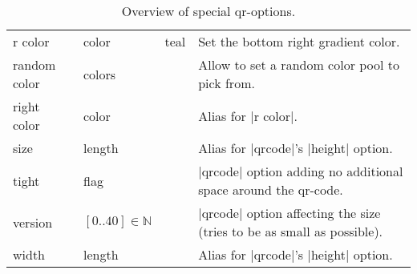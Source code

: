 \documentclass[parskip=half,english,numbers=noenddot,footnotes=nomultiple,oneside]{scrartcl}
\begin{document}
\begin{savenotes}
\begin{table}
\begin{tabular}{>{\ttfamily}ll>{\ttfamily}cp{.5\linewidth}}
		r color         & color   &  teal    & Set the bottom right gradient color.                         \\
		random color    & colors  &          & Allow to set a random color pool to pick from.               \\
		right color     & color   &          & Alias for |r color|.                                         \\
		size            & length  &          & Alias for |qrcode|'s |height| option.                        \\
		tight           & flag    &          & |qrcode| option adding no additional space around the qr-code.                                                    \\
		version         & \([0..40] \in \mathbb{N}\) &   0      & |qrcode| option affecting the size (tries to be as small as possible).                                             \\
		width           & length  &          & Alias for |qrcode|'s |height| option.                        \\
		\bottomrule
	\end{tabular}
	\caption{Overview of special qr-options.}
	\label{tbl:extra-keys}
\end{table}
\end{savenotes}
\end{document}
